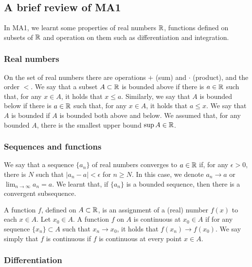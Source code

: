 \subsection*{A brief review of MA1}
In MA1, we learnt some properties of real numbers $\mathbb{R}$, functions defined on subsets of $\mathbb{R}$
and operation on them such as differentiation and integration.

\subsubsection*{Real numbers}
On the set of real numbers there are operations $+$ (sum) and $\cdot$ (product), and the order $<$.
We say that a subset $A \subset \mathbb{R}$ is bounded above if there is $a \in \mathbb{R}$ such that,
for any $x \in A$, it holds that $x \le a$. Similarly, we say that $A$ is bounded below if there is $a \in \mathbb{R}$
such that, for any $x \in A$, it holds that $a \le x$. We say that $A$ is bounded if $A$ is bounded both above and below.
We assumed that, for any bounded $A$, there is the smallest upper bound $\sup A \in \mathbb{R}$.

\subsubsection*{Sequences and functions}

We say that a sequence $\{a_n\}$ of real numbers converges to $a \in \mathbb{R}$ if, for any $\epsilon > 0$,
there is $N$ such that $|a_n - a| < \epsilon$ for $n \ge N$. In this case, we denote $a_n \to a$ or $\lim_{n\to \infty}a_n = a$.
We learnt that, if $\{a_n\}$ is a bounded sequence, then there is a convergent subsequence.

A function $f$, defined on $A \subset \mathbb{R}$, is an assignment of a (real) number $f(x)$ to each $x \in A$.
Let $x_0 \in A$. A function $f$ on $A$ is continuous at $x_0 \in A$ if for any sequence $\{x_n\} \subset A$ such that $x_n \to x_0$,
it holds that $f(x_n) \to f(x_0)$. We say simply that $f$ is continuous if $f$ is continuous at every point $x \in A$.

\subsubsection*{Differentiation}

